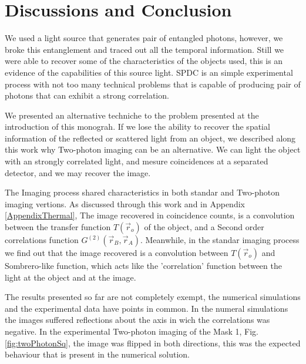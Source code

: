 
\chapter{Discussions and Conclusion} %

\label{Chapter5} %


We used a light source that generates pair of entangled photons, however, we broke this entanglement and traced out all the temporal
information. Still we were able to recover some of the characteristics of the objects used, this is an evidence of the capabilities of this source light.
SPDC is an simple experimental process with not too many technical problems that is capable of producing pair of photons
that can exhibit a strong correlation.

We presented an alternative techniche to the problem presented at the introduction of this monograh. If we lose the ability to recover
the spatial information of the reflected or scattered light from an object, we described along this work why Two-photon
imaging can be an alternative. We can light the object with an strongly correlated light, and mesure coincidences at a separated detector, and 
we may recover the image.

The Imaging process shared characteristics in both standar and Two-photon imaging vertions. As discussed through this work and in Appendix \ref{AppendixThermal},
The image recovered in coincidence counts, is a convolution between the transfer function $T(\vec{r}_o)$ of the object, 
and a Second order correlations function $G^{(2)}(\vec{r}_B,\vec{r}_A)$. Meanwhile, in the standar imaging process we find out
that the image recovered is a convolution between $T(\vec{r}_o)$ and Sombrero-like function, which acts like 
the 'correlation' function between the light at the object and at the image.




The results presented so far are not completely exempt, the numerical simulations and the experimental data have points in common. 
In the numeral simulations the images suffered reflections about the axis in wich the correlations was negative. In the experimental Two-photon
imaging of the Mask 1, Fig. \ref{fig:twoPhotonSq}, the image was flipped in both directions, this was the expected behaviour that is present
in the numerical solution.

